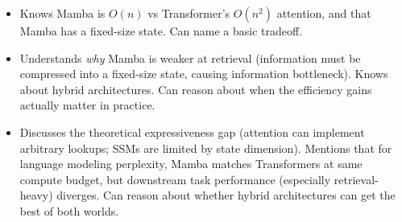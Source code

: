 \begin{interviewq}

\goodgreat
\begin{itemize}
    \item {} Knows Mamba is $O(n)$ vs Transformer's $O(n^2)$ attention, and that Mamba has a fixed-size state. Can name a basic tradeoff.
    \item {} Understands \textit{why} Mamba is weaker at retrieval (information must be compressed into a fixed-size state, causing information bottleneck). Knows about hybrid architectures. Can reason about when the efficiency gains actually matter in practice.
    \item {} Discusses the theoretical expressiveness gap (attention can implement arbitrary lookups; SSMs are limited by state dimension). Mentions that for language modeling perplexity, Mamba matches Transformers at same compute budget, but downstream task performance (especially retrieval-heavy) diverges. Can reason about whether hybrid architectures can get the best of both worlds.
\end{itemize}

\end{interviewq}

